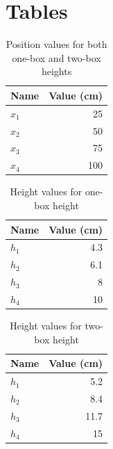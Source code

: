 \section{Tables}
\begin{table}[ht]
    \centering
    \begin{tabular}{|l|r|}
        \hline
        Name & Value (cm) \\
        \hline
        $x_{1}$ & 25 \\
        $x_{2}$ & 50 \\
        $x_{3}$ & 75 \\
        $x_{4}$ & 100 \\
        \hline
    \end{tabular}
    \caption{Position values for both one-box and two-box heights}
    \label{table:07.x}
\end{table}
\begin{table}[ht]
    \centering
    \begin{tabular}{|l|r|}
        \hline
        Name & Value (cm) \\
        \hline
        $h_{1}$ & 4.3 \\
        $h_{2}$ & 6.1 \\
        $h_{3}$ & 8 \\
        $h_{4}$ & 10 \\
        \hline
    \end{tabular}
    \caption{Height values for one-box height}
    \label{table:07.h.1}
\end{table}
\begin{table}[ht]
    \centering
    \begin{tabular}{|l|r|}
        \hline
        Name & Value (cm) \\
        \hline
        $h_{1}$ & 5.2 \\
        $h_{2}$ & 8.4 \\
        $h_{3}$ & 11.7 \\
        $h_{4}$ & 15 \\
        \hline
    \end{tabular}
    \caption{Height values for two-box height}
    \label{table:07.h.2}
\end{table}
